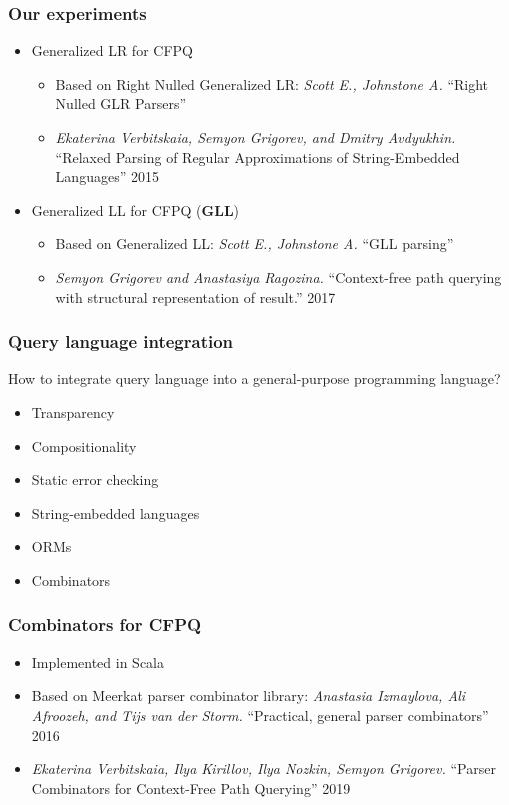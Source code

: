 \documentclass[xcolor=table]{beamer}
\begin{document}
\begin{frame}[fragile] \frametitle{Our experiments}

\begin{itemize}
\item Generalized LR for CFPQ
\begin{itemize}
  \item Based on Right Nulled Generalized LR: \emph{Scott E., Johnstone A.} ``Right Nulled GLR Parsers''
  \item \emph{Ekaterina Verbitskaia, Semyon Grigorev, and Dmitry Avdyukhin.} ``Relaxed Parsing of Regular Approximations of String-Embedded Languages'' 2015
\end{itemize}

\pause

\item Generalized LL for CFPQ (\textbf{GLL})
\begin{itemize}
  \item Based on Generalized LL: \emph{Scott E., Johnstone A.} ``GLL parsing''
  \item \emph{Semyon Grigorev and Anastasiya Ragozina.} ``Context-free path querying with structural
  representation of result.'' 2017
\end{itemize}

\end{itemize}
\end{frame}

\begin{frame}[fragile] \frametitle{Query language integration}
How to integrate query language into a general-purpose programming language?
\begin{itemize}
\item Transparency
\item Compositionality
\item Static error checking
\end{itemize}
\pause
\begin{itemize}
  \item String-embedded languages
  \item ORMs
  \item Combinators
\end{itemize}
\end{frame}

\begin{frame}[fragile] \frametitle{Combinators for CFPQ}
  \begin{itemize}
    \item Implemented in Scala
    \item Based on Meerkat parser combinator library: \emph{Anastasia Izmaylova, Ali Afroozeh, and Tijs van der Storm.} ``Practical, general parser combinators'' 2016
    \item \emph{Ekaterina Verbitskaia, Ilya Kirillov, Ilya Nozkin, Semyon Grigorev.} ``Parser Combinators for Context-Free Path Querying'' 2019
  \end{itemize}
\end{frame}
\end{document}
